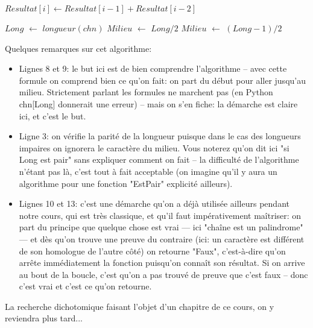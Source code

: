 \documentclass[12pt]{article}
\begin{document}
\begin{MaReponse}
\begin{alphenum}
\begin{algorithmic}[1]
				\State$Resultat[i] \leftarrow Resultat[i-1] + Resultat[i-2]$
				\EndFor
				\State{}
				\EndFunction
			\end{algorithmic}
			\vspace{\baselineskip}
			\item
			\begin{algorithmic}[1]
				\State $Long$ $\leftarrow$ $longueur(chn)$
				\State $Milieu$ $\leftarrow$ $Long / 2$
				\Else
				\State $Milieu$ $\leftarrow$ $(Long  - 1) / 2$
				\EndIf
				\State{}
				\EndIf
				\EndFor
				\State{}
				\EndFunction
			\end{algorithmic}
			Quelques remarques sur cet algorithme:
			\begin{itemize}
				\item Lignes 8 et 9: le but ici est de bien comprendre l'algorithme -- avec cette formule on comprend bien ce qu'on fait: on part du début pour aller jusqu'au milieu. Strictement parlant les formules ne marchent pas (en Python chn[Long] donnerait une erreur) -- mais on s'en fiche: la démarche est claire ici, et c'est le but.
				\item Ligne 3: on vérifie la parité de la longueur puisque dans le cas des longueurs impaires on ignorera le caractère du milieu. Vous noterez qu'on dit ici "si Long est pair" sans expliquer comment on fait -- la difficulté de l'algorithme n'étant pas là, c'est tout à fait acceptable (on imagine qu'il y aura un algorithme pour une fonction "EstPair" explicité ailleurs).
				\item Lignes 10 et 13: c'est une démarche qu'on a déjà utilisée ailleurs pendant notre cours, qui est très classique, et qu'il faut impérativement maîtriser: on part du principe que quelque chose est vrai --- ici "chaîne est un palindrome" --- et dès qu'on trouve une preuve du contraire (ici: un caractère est différent de son homologue de l'autre côté) on retourne "Faux", c'est-à-dire qu'on arrête immédiatement la fonction puisqu'on connaît son résultat. Si on arrive au bout de la boucle, c'est qu'on a pas trouvé de preuve que c'est faux -- donc c'est vrai et c'est ce qu'on retourne.
			\end{itemize}
			\vspace{\baselineskip}
			\item La recherche dichotomique faisant l'objet d'un chapitre de ce cours, on y reviendra plus tard...
		\end{alphenum}
	\end{MaReponse}
	
\end{document}
